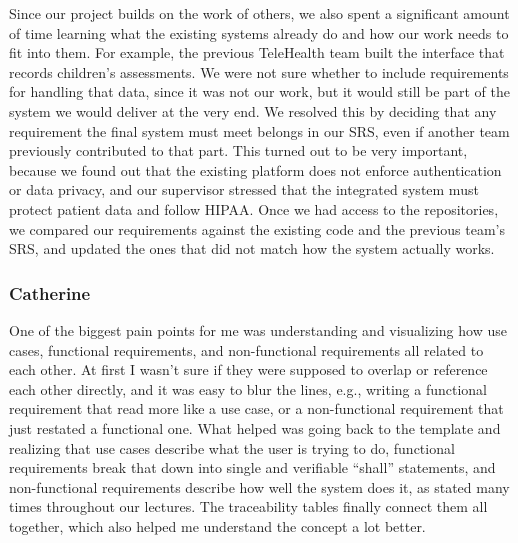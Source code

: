 \documentclass[12pt]{article}
\begin{document}
Since our project builds on the work of others, we also spent a significant amount of time learning what the existing systems already do and how our work needs to fit into them. For example, the previous TeleHealth team built the interface that records children’s assessments. We were not sure whether to include requirements for handling that data, since it was not our work, but it would still be part of the system we would deliver at the very end. We resolved this by deciding that any requirement the final system must meet belongs in our SRS, even if another team previously contributed to that part. This turned out to be very important, because we found out that the existing platform does not enforce authentication or data privacy, and our supervisor stressed that the integrated system must protect patient data and follow HIPAA. Once we had access to the repositories, we compared our requirements against the existing code and the previous team’s SRS, and updated the ones that did not match how the system actually works.

\subsubsection*{Catherine}
One of the biggest pain points for me was understanding and visualizing how use cases, functional
requirements, and non-functional requirements all related to each other. 
At first I wasn't sure if they were supposed to overlap or reference each other directly, and it was easy
to blur the lines, e.g., writing a functional requirement that read more like a use case,
or a non-functional requirement that just restated a functional one. What helped was
going back to the template and realizing that use cases describe what the user is trying
to do, functional requirements break that down into single and verifiable ``shall''
statements, and non-functional requirements describe how well the system does it, as stated
many times throughout our lectures. The traceability tables finally connect them all together,
which also helped me understand the concept a lot better.
\end{document}
